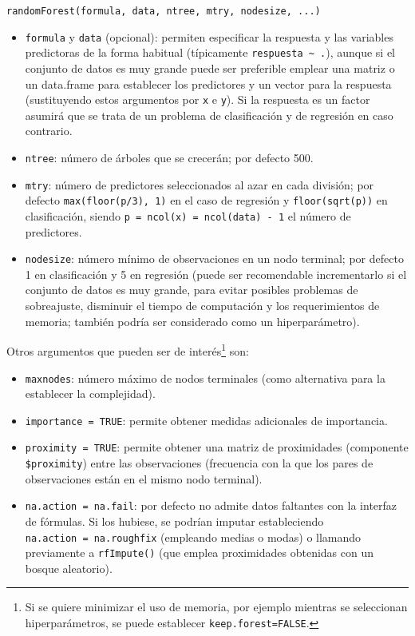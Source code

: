 \documentclass[
]{book}
\theoremstyle{break}
\theoremstyle{nonumberplain}
\begin{document}
\texttt{randomForest(formula,\ data,\ ntree,\ mtry,\ nodesize,\ ...)}

\begin{itemize}
\item
  \texttt{formula} y \texttt{data} (opcional): permiten especificar la respuesta y las variables predictoras de la forma habitual (típicamente \texttt{respuesta\ \textasciitilde{}\ .}), aunque si el conjunto de datos es muy grande puede ser preferible emplear una matriz o un data.frame para establecer los predictores y un vector para la respuesta (sustituyendo estos argumentos por \texttt{x} e \texttt{y}).
  Si la respuesta es un factor asumirá que se trata de un problema de clasificación y de regresión en caso contrario.
\item
  \texttt{ntree}: número de árboles que se crecerán; por defecto 500.
\item
  \texttt{mtry}: número de predictores seleccionados al azar en cada división; por defecto \texttt{max(floor(p/3),\ 1)} en el caso de regresión y \texttt{floor(sqrt(p))} en clasificación, siendo \texttt{p\ =\ ncol(x)\ =\ ncol(data)\ -\ 1} el número de predictores.
\item
  \texttt{nodesize}: número mínimo de observaciones en un nodo terminal; por defecto 1 en clasificación y 5 en regresión (puede ser recomendable incrementarlo si el conjunto de datos es muy grande, para evitar posibles problemas de sobreajuste, disminuir el tiempo de computación y los requerimientos de memoria; también podría ser considerado como un hiperparámetro).
\end{itemize}

Otros argumentos que pueden ser de interés\footnote{Si se quiere minimizar el uso de memoria, por ejemplo mientras se seleccionan hiperparámetros, se puede establecer \texttt{keep.forest=FALSE}.} son:

\begin{itemize}
\item
  \texttt{maxnodes}: número máximo de nodos terminales (como alternativa para la establecer la complejidad).
\item
  \texttt{importance\ =\ TRUE}: permite obtener medidas adicionales de importancia.
\item
  \texttt{proximity\ =\ TRUE}: permite obtener una matriz de proximidades (componente \texttt{\$proximity}) entre las observaciones (frecuencia con la que los pares de observaciones están en el mismo nodo terminal).
\item
  \texttt{na.action\ =\ na.fail}: por defecto no admite datos faltantes con la interfaz de fórmulas. Si los hubiese, se podrían imputar estableciendo \texttt{na.action\ =\ na.roughfix} (empleando medias o modas) o llamando previamente a \texttt{rfImpute()} (que emplea proximidades obtenidas con un bosque aleatorio).
\end{itemize}
\end{document}
